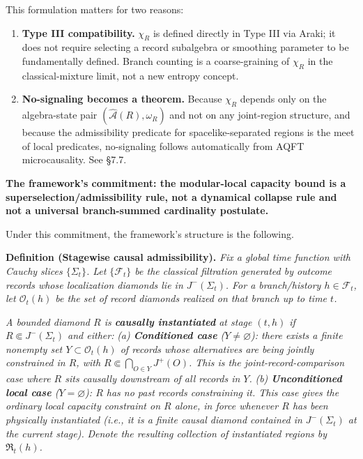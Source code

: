 \documentclass[11pt,a4paper]{article}
\begin{document}
This formulation matters for two reasons:

\begin{enumerate}
  \item \textbf{Type III compatibility.} $\chi_R$ is defined directly in Type III via Araki; it does not require selecting a record subalgebra or smoothing parameter to be fundamentally defined. Branch counting is a coarse-graining of $\chi_R$ in the classical-mixture limit, not a new entropy concept.
  \item \textbf{No-signaling becomes a theorem.} Because $\chi_R$ depends only on the algebra-state pair $(\hat{\mathcal{A}}(R), \omega_R)$ and not on any joint-region structure, and because the admissibility predicate for spacelike-separated regions is the meet of local predicates, no-signaling follows automatically from AQFT microcausality. See §7.7.
\end{enumerate}

\textbf{The framework's commitment: the modular-local capacity bound is a superselection/admissibility rule, not a dynamical collapse rule and not a universal branch-summed cardinality postulate.}

Under this commitment, the framework's structure is the following.

\textbf{Definition (Stagewise causal admissibility).} \emph{Fix a global time function with Cauchy slices $\{\Sigma_t\}$. Let $\{\mathcal{F}_t\}$ be the classical filtration generated by outcome records whose localization diamonds lie in $J^-(\Sigma_t)$. For a branch/history $h \in \mathcal{F}_t$, let $\mathcal{O}_t(h)$ be the set of record diamonds realized on that branch up to time $t$.}

\emph{A bounded diamond $R$ is \textbf{causally instantiated} at stage $(t, h)$ if $R \Subset J^-(\Sigma_t)$ and either:}
\emph{(a) \textbf{Conditioned case} ($Y \ne \varnothing$): there exists a finite nonempty set $Y \subset \mathcal{O}_t(h)$ of records whose alternatives are being jointly constrained in $R$, with $R \Subset \bigcap_{O \in Y} J^+(O)$. This is the joint-record-comparison case where $R$ sits causally downstream of all records in $Y$.}
\emph{(b) \textbf{Unconditioned local case} ($Y = \varnothing$): $R$ has no past records constraining it. This case gives the ordinary local capacity constraint on $R$ alone, in force whenever $R$ has been physically instantiated (i.e., it is a finite causal diamond contained in $J^-(\Sigma_t)$ at the current stage).}
\emph{Denote the resulting collection of instantiated regions by $\mathfrak{R}_t(h)$.}
\end{document}
